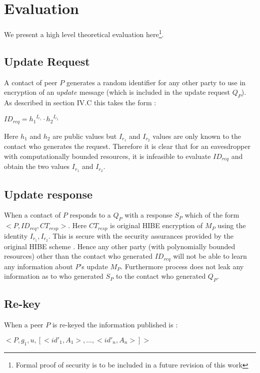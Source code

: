 \section{Evaluation}

We present a high level theoretical evaluation here\footnote{Formal proof of security is to be included in a future revision of this work}.

\subsection{Update Request}
A contact of peer $P$ generates a random identifier for any other party to use in encryption of an $update$ message (which is included in the update request $Q_P$). As described in section IV.C this takes the form :
\begin{center}
$ID_{req} = {h_1}^{I_{r_1}} \cdot {h_2}^{I_{r_2}}$
\end{center}

Here $h_1$ and $h_2$ are public values but $I_{r_1}$ and $I_{r_2}$ values are only known to the contact who generates the request. Therefore it is clear that for an eavesdropper with computationally bounded resources, it is infeasible to evaluate $ID_{req}$ and obtain the two values $I_{r_1}$ and $I_{r_2}$.

\subsection{Update response}
When a contact  of $P$ responds to a $Q_P$ with a response $S_P$ which of the form $<P, ID_{req}, CT_{resp}>$. Here $CT_{resp}$ is original HIBE encryption of $M_P$ using the identity $I_{r_1}, I_{r_2}$. This is secure with the security assurances provided by the original HIBE scheme \cite{BBG05}. Hence any other party (with polynomially bounded resources) other than the contact who generated $ID_{req}$ will not be able to learn any information about $P$'s update $M_P$. Furthermore process does not leak any information as to who generated $S_P$ to the contact who generated $Q_P$.

\subsection{Re-key}

When a peer $P$ is re-keyed the information published is :
\begin{center}
$<P, g_1, u, [<{id'}_1, A_1>, ...,  <{id'}_n, A_n>]>$
\end{center}

